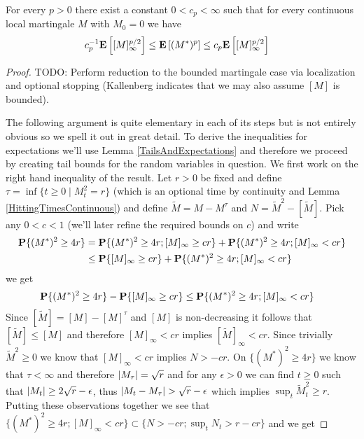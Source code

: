 \begin{thm}\label{BDGInequalities}For every $p > 0$ there exist a constant $0 < c_p < \infty$ such that for every continuous local martingale $M$ with $M_0 = 0$ we have
\begin{align*}
c_p^{-1} \textbf{E}\left[[M]^{p/2}_\infty\right] &\leq \textbf{E}\left[(M^*)^p\right] \leq c_p \textbf{E}\left[[M]^{p/2}_\infty\right]
\end{align*}
\end{thm}
\begin{proof}
TODO: Perform reduction to the bounded martingale case via localization and optional stopping (Kallenberg indicates that we may also assume $[M]$ is bounded).

The following argument is quite elementary in each of its steps but is not entirely obvious so we spell it out in great detail.  To derive the inequalities for expectations we'll use Lemma \ref{TailsAndExpectations} and therefore we proceed by creating tail bounds for the random variables in question.  We first work on the right hand inequality of the result.  Let $r > 0$ be fixed and define $\tau = \inf \lbrace t \geq 0 \mid M_t^2 = r \rbrace$ (which is an optional time by continuity and Lemma \ref{HittingTimesContinuous}) and define $\tilde{M} = M - M^\tau$ and $N = \tilde{M}^2 - [\tilde{M}]$.  Pick any $0 < c < 1$ (we'll later refine the required bounds on $c$) and write
\begin{align*}
\textbf{P}\{(M^*)^2 \geq 4r\} &= \textbf{P}\{(M^*)^2 \geq 4r ; [M]_\infty \geq cr\} + \textbf{P}\{(M^*)^2 \geq 4r; [M]_\infty < cr\} \\
&\leq \textbf{P}\{[M]_\infty \geq cr\} + \textbf{P}\{(M^*)^2 \geq 4r; [M]_\infty < cr\} 
\end{align*}
we get
\begin{align*}
\textbf{P}\{(M^*)^2 \geq 4r\} - \textbf{P}\{[M]_\infty \geq cr\} &\leq \textbf{P}\{(M^*)^2 \geq 4r; [M]_\infty < cr\} 
\end{align*}
Since $[\tilde{M}] = [M] - [M]^\tau$ and $[M]$ is non-decreasing it follows that $[\tilde{M}] \leq [M]$ and therefore $[M]_\infty < cr$ implies $[\tilde{M}]_\infty < cr$.  Since trivially $\tilde{M}^2 \geq 0$ we know that $[M]_\infty < cr$ implies $N > -cr$.  On $\lbrace (M^*)^2 \geq 4r \rbrace$ we know that $\tau < \infty$ and therefore $\left \vert M_\tau \right \vert = \sqrt{r}$ and for any $\epsilon > 0$ we can find $t \geq 0$ such that $\left \vert M_t \right \vert \geq 2\sqrt{r} - \epsilon$, thus $\left \vert M_t - M_\tau \right \vert > \sqrt{r} - \epsilon$ which implies $\sup_t \tilde{M}^2_t \geq r$.  Putting these observations together we see that $\lbrace (M^*)^2 \geq 4r; [M]_\infty < cr \rbrace \subset \lbrace N > -cr; \sup_t N_t > r - cr \rbrace$ and we get 

\end{proof}
